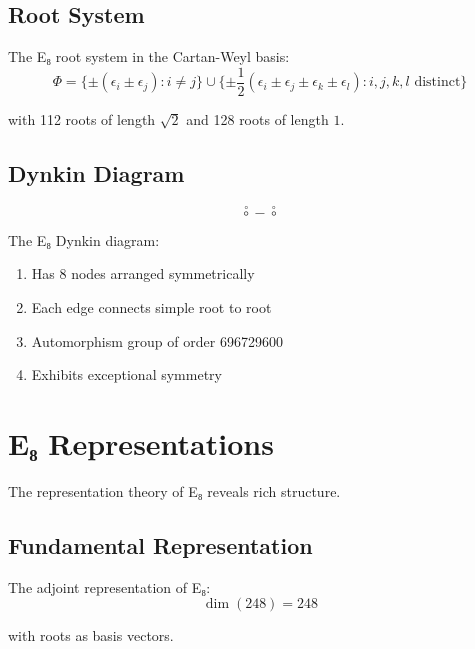 \subsection{Root System}

\begin{theorem}
\label{thm:e8-roots}
The E₈ root system in the Cartan-Weyl basis:
\begin{equation}
\Phi = \{\pm(\epsilon_i \pm \epsilon_j) : i \neq j\} \cup \{\pm\frac{1}{2}(\epsilon_i \pm \epsilon_j \pm \epsilon_k \pm \epsilon_l) : i,j,k,l \text{ distinct}\}
\end{equation}

with 112 roots of length $\sqrt{2}$ and 128 roots of length $1$.
\end{theorem}

\subsection{Dynkin Diagram}

\begin{equation}
\overset{\circ}{\circ} - \overset{\circ}{\circ}
\end{equation}

\begin{proposition}
\label{prop:dynkin}
The E₈ Dynkin diagram:
\begin{enumerate}
\item Has 8 nodes arranged symmetrically
\item Each edge connects simple root to root
\item Automorphism group of order 696729600
\item Exhibits exceptional symmetry
\end{enumerate}
\end{proposition}

\section{E₈ Representations}

The representation theory of E₈ reveals rich structure.

\subsection{Fundamental Representation}

\begin{definition}
\label{def:adj}
The adjoint representation of E₈:
\begin{equation}
\dim(248) = 248
\end{equation}

with roots as basis vectors.
\end{definition}

